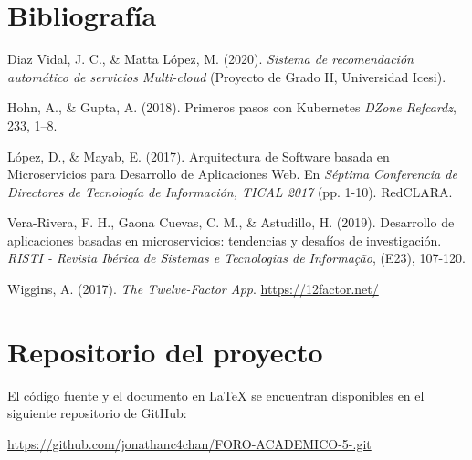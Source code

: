 \documentclass[12pt,letterpaper]{article}
\begin{document}
\section*{ Bibliografía}
\vspace{4pt}

\hangindent=1cm \noindent Diaz Vidal, J. C., \& Matta López, M. (2020). \textit{Sistema de recomendación automático de servicios Multi-cloud} (Proyecto de Grado II, Universidad Icesi).

\vspace{4pt}
\hangindent=1cm \noindent Hohn, A., \& Gupta, A. (2018). Primeros pasos con Kubernetes \textit{DZone Refcardz}, 233, 1–8.

\vspace{4pt}
\hangindent=1cm \noindent López, D., \& Mayab, E. (2017). Arquitectura de Software basada en Microservicios para Desarrollo de Aplicaciones Web. En \textit{Séptima Conferencia de Directores de Tecnología de Información, TICAL 2017} (pp. 1-10). RedCLARA.

\vspace{4pt}
\hangindent=1cm \noindent Vera-Rivera, F. H., Gaona Cuevas, C. M., \& Astudillo, H. (2019). Desarrollo de aplicaciones basadas en microservicios: tendencias y desafíos de investigación. \textit{RISTI - Revista Ibérica de Sistemas e Tecnologias de Informação}, (E23), 107-120.

\vspace{4pt}
\hangindent=1cm \noindent Wiggins, A. (2017). \textit{The Twelve-Factor App}. \url{https://12factor.net/}

\section*{Repositorio del proyecto}

El código fuente y el documento en \LaTeX{} se encuentran disponibles en el siguiente repositorio de GitHub:

\url{https://github.com/jonathanc4chan/FORO-ACADEMICO-5-.git}
\end{document}
